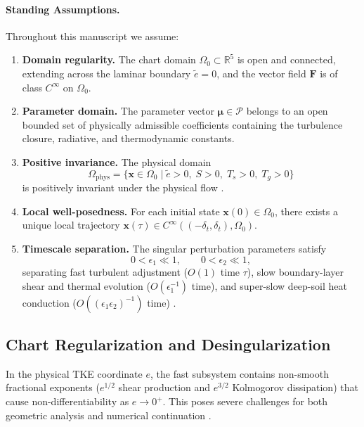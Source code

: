 \paragraph{Standing Assumptions.}
Throughout this manuscript we assume:
\begin{enumerate}
\item[\textbf{(A1)}] \textbf{Domain regularity.} The chart domain $\Omega_0 \subset \mathbb{R}^5$ is open and connected, extending across the laminar boundary $\tilde e = 0$, and the vector field $\mathbf{F}$ is of class $C^\infty$ on $\Omega_0$.
\item[\textbf{(A2)}] \textbf{Parameter domain.} The parameter vector $\boldsymbol{\mu} \in \mathcal{P}$ belongs to an open bounded set of physically admissible coefficients containing the turbulence closure, radiative, and thermodynamic constants.
\item[\textbf{(A3)}] \textbf{Positive invariance.} The physical domain
\begin{equation}
\Omega_{\mathrm{phys}} = \{\mathbf{x} \in \Omega_0 \mid \tilde e > 0,\; S > 0,\; T_s > 0,\; T_g > 0\}
\end{equation}
is positively invariant under the physical flow \citep{vanDeWiel2017}.
\item[\textbf{(A4)}] \textbf{Local well-posedness.} For each initial state $\mathbf{x}(0) \in \Omega_0$, there exists a unique local trajectory $\mathbf{x}(\tau) \in C^\infty((-\delta_t, \delta_t), \Omega_0)$.
\item[\textbf{(A5)}] \textbf{Timescale separation.} The singular perturbation parameters satisfy
\begin{equation}
0 < \epsilon_1 \ll 1, \qquad 0 < \epsilon_2 \ll 1,
\end{equation}
separating fast turbulent adjustment ($O(1)$ time $\tau$), slow boundary-layer shear and thermal evolution ($O(\epsilon_1^{-1})$ time), and super-slow deep-soil heat conduction ($O((\epsilon_1\epsilon_2)^{-1})$ time) \citep{Kuehn2015, Kristiansen2024}.
\end{enumerate}

\subsection{Chart Regularization and Desingularization}

In the physical TKE coordinate $e$, the fast subsystem contains non-smooth fractional exponents ($e^{1/2}$ shear production and $e^{3/2}$ Kolmogorov dissipation) that cause non-differentiability as $e \to 0^+$. This poses severe challenges for both geometric analysis and numerical continuation \citep{desroches2012canards, Steinebach2023Rodas5P}.

